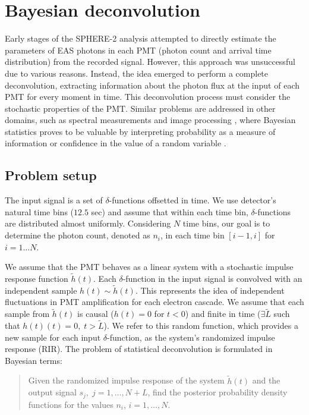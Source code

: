 \chapter{Bayesian deconvolution}
\label{chapt:bayesian-deconvolution}

Early stages of the SPHERE-2 analysis attempted to directly estimate the parameters of EAS photons in each PMT (photon count and arrival time distribution) from the recorded signal. However, this approach was unsuccessful due to various reasons. Instead, the idea emerged to perform a complete deconvolution, extracting information about the photon flux at the input of each PMT for every moment in time. This deconvolution process must consider the stochastic properties of the PMT. Similar problems are addressed in other domains, such as spectral measurements \cite{Rhode1993} and image processing \cite{Wipf2013}, where Bayesian statistics proves to be valuable by interpreting probability as a measure of information or confidence in the value of a random variable \cite{Gelman2013}.

\section{Problem setup}

The input signal is a set of $\delta$-functions offsetted in time. We use detector's natural time bins ($12.5$ sec) and assume that within each time bin, $\delta$-functions are distributed almost uniformly. Considering $N$ time bins, our goal is to determine the photon count, denoted as $n_i$, in each time bin $[i-1, i]$ for $i = 1 \ldots N$.

We assume that the PMT behaves as a linear system with a stochastic impulse response function $\tilde{h}(t)$. Each $\delta$-function in the input signal is convolved with an independent sample $h(t) \sim \tilde{h}(t)$. This represents the idea of independent fluctuations in PMT amplification for each electron cascade. We assume that each sample from $\tilde{h}(t)$ is causal ($h(t) = 0$ for $t < 0$) and finite in time ($\exists \tilde{L}$ such that $h(t)(t) = 0, \; t > \tilde{L}$). We refer to this random function, which provides a new sample for each input $\delta$-function, as the system's randomized impulse response (RIR). The problem of statistical deconvolution is formulated in Bayesian terms:

\begin{quote}
	Given the randomized impulse response of the system $\tilde{h}(t)$ and the output signal $s_j, \; j = 1, \ldots, N + L$, find the posterior probability density functions for the values $n_i$, $i = 1, \ldots, N$.
\end{quote}

